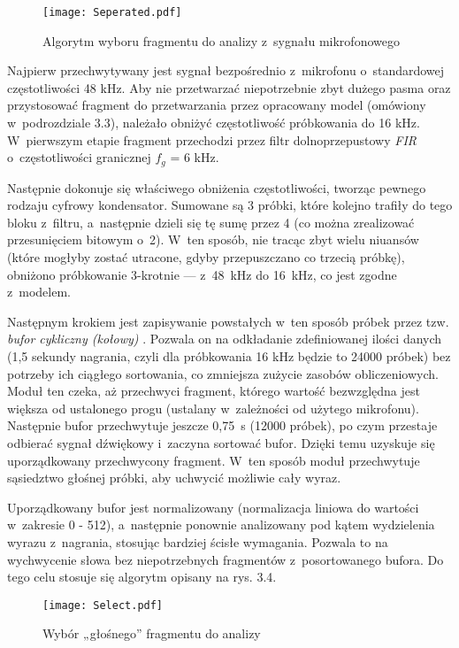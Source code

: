 \begin{figure}[h]
	\centering
	\texttt{[image: Seperated.pdf]}
	\caption{Algorytm wyboru fragmentu do analizy z~sygnału mikrofonowego}
\end{figure}

Najpierw przechwytywany jest sygnał bezpośrednio z~mikrofonu o~standardowej częstotliwości 48 kHz. Aby nie przetwarzać niepotrzebnie zbyt dużego pasma oraz przystosować fragment do przetwarzania przez opracowany model (omówiony w~podrozdziale 3.3), należało obniżyć częstotliwość próbkowania do 16 kHz. W~pierwszym etapie fragment przechodzi przez filtr dolnoprzepustowy \textit{FIR} o~częstotliwości granicznej $f_g$ = 6 kHz.

Następnie dokonuje się właściwego obniżenia częstotliwości, tworząc pewnego rodzaju cyfrowy kondensator. Sumowane są 3 próbki, które kolejno trafiły do tego bloku z~filtru, a~następnie dzieli się tę sumę przez 4 (co można zrealizować przesunięciem bitowym o~2). W~ten sposób, nie tracąc zbyt wielu niuansów (które mogłyby zostać utracone, gdyby przepuszczano co trzecią próbkę), obniżono próbkowanie 3-krotnie — z~48~kHz do 16~kHz, co jest zgodne z~modelem.

Następnym krokiem jest zapisywanie powstałych w~ten sposób próbek przez tzw. \textit{bufor cykliczny (kołowy)} \cite{Wiki:Circular}. Pozwala on na odkładanie zdefiniowanej ilości danych (1,5 sekundy nagrania, czyli dla próbkowania 16 kHz będzie to 24000 próbek) bez potrzeby ich ciągłego sortowania, co zmniejsza zużycie zasobów obliczeniowych. Moduł ten czeka, aż przechwyci fragment, którego wartość bezwzględna jest większa od ustalonego progu (ustalany w~zależności od użytego mikrofonu). Następnie bufor przechwytuje jeszcze 0,75~s (12000 próbek), po czym przestaje odbierać sygnał dźwiękowy i~zaczyna sortować bufor. Dzięki temu uzyskuje się uporządkowany przechwycony fragment. W~ten sposób moduł przechwytuje sąsiedztwo głośnej próbki, aby uchwycić możliwie cały wyraz.

Uporządkowany bufor jest normalizowany (normalizacja liniowa do wartości w~zakresie 0 - 512), a~następnie ponownie analizowany pod kątem wydzielenia wyrazu z~nagrania, stosując bardziej ścisłe wymagania. Pozwala to na wychwycenie słowa bez niepotrzebnych fragmentów z~posortowanego bufora. Do tego celu stosuje się algorytm opisany na rys. 3.4.

\begin{figure}[h]
	\centering
	\texttt{[image: Select.pdf]}
	\caption{Wybór „głośnego” fragmentu do analizy}
\end{figure}
\FloatBarrier %

